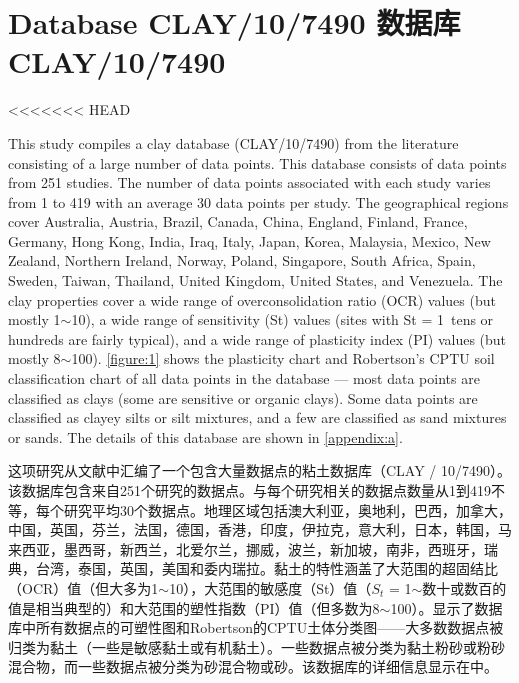 \section{Database CLAY/10/7490 数据库CLAY/10/7490}

<<<<<<< HEAD
\begin{paracol}{2}
    
    This study compiles a clay database (CLAY/10/7490) from the literature consisting of a large number of data points. This database consists of data points from 251 studies. The number of data points associated with each study varies from 1 to 419 with an average 30 data points per study. The geographical regions cover Australia, Austria, Brazil, Canada, China, England, Finland, France, Germany, Hong Kong, India, Iraq, Italy, Japan, Korea, Malaysia, Mexico, New Zealand, Northern Ireland, Norway, Poland, Singapore, South Africa, Spain, Sweden, Taiwan, Thailand, United Kingdom, United States, and Venezuela. The clay properties cover a wide range of overconsolidation ratio (OCR) values (but mostly 1$\sim$10), a wide range of sensitivity (St) values (sites with St = 1~tens or hundreds are fairly typical), and a wide range of plasticity index (PI) values (but mostly 8$\sim$100). \autoref{figure:1} shows the plasticity chart and Robertson’s CPTU soil classification chart \citep{Robertson1990151} of all data points in the database — most data points are classified as clays (some are sensitive or organic clays). Some data points are classified as clayey silts or silt mixtures, and a few are classified as sand mixtures or sands. The details of this database are shown in \autoref{appendix:a}.
    
    \switchcolumn
    
    这项研究从文献中汇编了一个包含大量数据点的粘土数据库（CLAY / 10/7490）。该数据库包含来自251个研究的数据点。与每个研究相关的数据点数量从1到419不等，每个研究平均30个数据点。地理区域包括澳大利亚，奥地利，巴西，加拿大，中国，英国，芬兰，法国，德国，香港，印度，伊拉克，意大利，日本，韩国，马来西亚，墨西哥，新西兰，北爱尔兰，挪威，波兰，新加坡，南非，西班牙，瑞典，台湾，泰国，英国，美国和委内瑞拉。黏土的特性涵盖了大范围的超固结比（OCR）值（但大多为1$\sim$10），大范围的敏感度（St）值（$S_t$ = 1$\sim$数十或数百的值是相当典型的）和大范围的塑性指数（PI）值（但多数为8$\sim$100）。显示了数据库中所有数据点的可塑性图和Robertson的CPTU土体分类图\citep{Robertson1990151}——大多数数据点被归类为黏土（一些是敏感黏土或有机黏土）。一些数据点被分类为黏土粉砂或粉砂混合物，而一些数据点被分类为砂混合物或砂。该数据库的详细信息显示在中。
\end{paracol}

